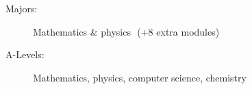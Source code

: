 \begin{description}
    \item[Majors:] Mathematics \& physics\,\, (+8 extra modules)
\end{description}

\divider

\begin{description}
    \item[A-Levels:] Mathematics, physics, computer science, chemistry
\end{description}
